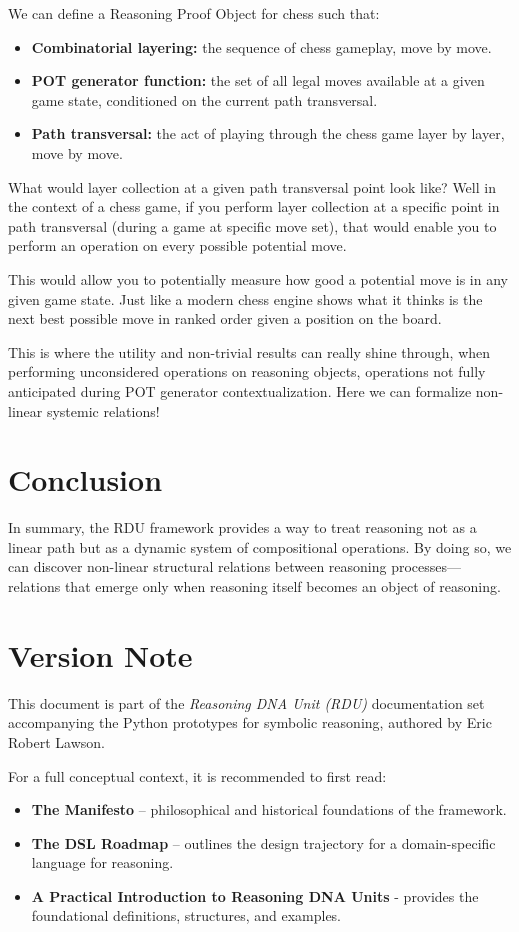 \documentclass[11pt]{article}
\begin{document}
We can define a Reasoning Proof Object for chess such that:
\begin{itemize}
\item \textbf{Combinatorial layering:} the sequence of chess gameplay, move by move.
\item \textbf{POT generator function:} the set of all legal moves available at a given game state, conditioned on the current path transversal.
\item \textbf{Path transversal:} the act of playing through the chess game layer by layer, move by move.
\end{itemize}

What would layer collection at a given path transversal point look like? Well in the context of a chess game, if you perform layer collection at a specific point in path transversal (during a game at specific move set), that would enable you to perform an operation on every possible potential move.

This would allow you to potentially measure how good a potential move is in any given game state. Just like a modern chess engine shows what it thinks is the next best possible move in ranked order given a position on the board.

This is where the utility and non-trivial results can really shine through, when performing unconsidered operations on reasoning objects, operations not fully anticipated during POT generator contextualization. Here we can formalize non-linear systemic relations!

\section*{Conclusion}

In summary, the RDU framework provides a way to treat reasoning not as a linear path but as a dynamic system of compositional operations. 
By doing so, we can discover non-linear structural relations between reasoning processes—relations that emerge only when reasoning itself becomes an object of reasoning.

\section*{Version Note}
This document is part of the \textit{Reasoning DNA Unit (RDU)} documentation set accompanying the Python prototypes for symbolic reasoning, authored by Eric Robert Lawson.

For a full conceptual context, it is recommended to first read:
\begin{itemize}
    \item \textbf{The Manifesto} – philosophical and historical foundations of the framework.
    \item \textbf{The DSL Roadmap} – outlines the design trajectory for a domain-specific language for reasoning.
    \item \textbf{A Practical Introduction to Reasoning DNA Units} - provides the foundational definitions, structures, and examples.
\end{itemize}
\end{document}
